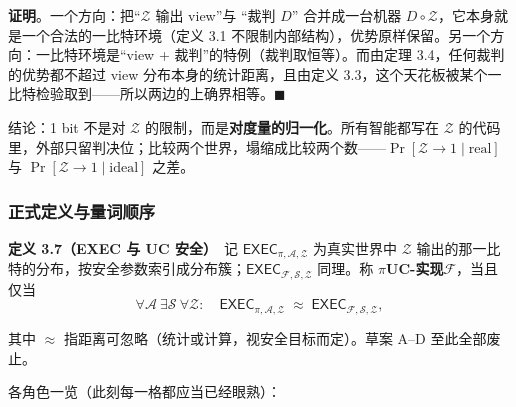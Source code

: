 \textbf{证明}。一个方向：把“$\mathcal{Z}$ 输出 view”与
“裁判 $D$”
合并成一台机器 $D \circ \mathcal{Z}$，它本身就是一个合法的一比特环境（定义
3.1 不限制内部结构），优势原样保留。另一个方向：一比特环境是“view +
裁判”的特例（裁判取恒等）。而由定理 3.4，任何裁判的优势都不超过 view
分布本身的统计距离，且由定义
3.3，这个天花板被某个一比特检验取到------所以两边的上确界相等。$\blacksquare$

结论：1 bit
不是对 $\mathcal{Z}$ 的限制，而是\textbf{对度量的归一化}。所有智能都写在 $\mathcal{Z}$ 的代码里，外部只留判决位；比较两个世界，塌缩成比较两个数------$\Pr[\mathcal{Z}\to 1 \mid \text{real}]$ 与 $\Pr[\mathcal{Z}\to 1 \mid \text{ideal}]$ 之差。

\subsubsection{正式定义与量词顺序}

\textbf{定义 3.7（EXEC 与 UC
安全）}　记 $\mathsf{EXEC}_{\pi,\mathcal{A},\mathcal{Z}}$ 为真实世界中 $\mathcal{Z}$ 输出的那一比特的分布，按安全参数索引成分布簇；$\mathsf{EXEC}_{\mathcal{F},\mathcal{S},\mathcal{Z}}$ 同理。称 $\pi$\textbf{UC-实现}$\mathcal{F}$，当且仅当
\begin{equation}\label{eq:uc-framework:3}
\forall \mathcal{A}\ \exists \mathcal{S}\ \forall \mathcal{Z}:\quad
\mathsf{EXEC}_{\pi,\mathcal{A},\mathcal{Z}} \;\approx\; \mathsf{EXEC}_{\mathcal{F},\mathcal{S},\mathcal{Z}},
\end{equation}

其中 $\approx$ 指距离可忽略（统计或计算，视安全目标而定）。草案 A--D
至此全部废止。

各角色一览（此刻每一格都应当已经眼熟）：

